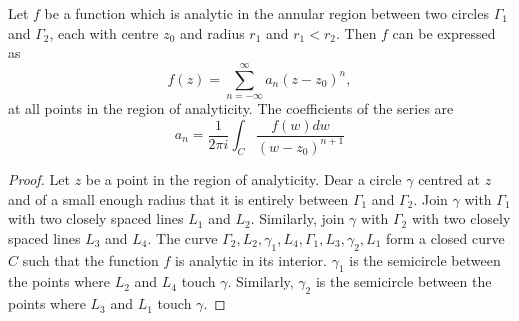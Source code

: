 \begin{thm}\label{c5e1e5}
Let $f$ be a function which is analytic in the annular region between two
circles $\Gamma_1$ and $\Gamma_2$, each with centre $z_0$ and radius $r_1$ 
and $r_1 < r_2$. Then $f$ can be expressed as
\[
f(z) = \sum_{n = -\infty}^\infty a_n (z - z_0)^n,
\]
at all points in the region of analyticity. The coefficients of the series
are
\[
a_n = \frac{1}{2\pi i}\int_C \frac{f(w)dw}{(w - z_0)^{n+1}}
\]
\end{thm}
\begin{proof}
Let $z$ be a point in the region of analyticity. Dear a circle $\gamma$ centred
at $z$ and of a small enough radius that it is entirely between $\Gamma_1$ and
$\Gamma_2$. Join $\gamma$ with $\Gamma_1$ with two closely spaced lines $L_1$
and $L_2$. Similarly, join $\gamma$ with $\Gamma_2$ with two closely spaced
lines $L_3$ and $L_4$. The curve $\Gamma_2, L_2, \gamma_1, L_4, \Gamma_1, L_3,
\gamma_2, L_1$ form a closed curve $C$ such that the function $f$ is analytic
in its interior. $\gamma_1$ is the semicircle between the points where $L_2$ 
and $L_4$ touch $\gamma$. Similarly, $\gamma_2$ is the semicircle between the
points where $L_3$ and $L_1$ touch $\gamma$.


\end{proof}
